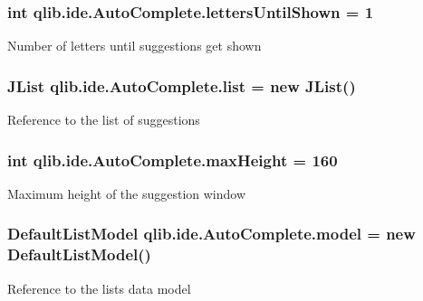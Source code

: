 \subsubsection[{\texorpdfstring{letters\+Until\+Shown}{lettersUntilShown}}]{\setlength{\rightskip}{0pt plus 5cm}int qlib.\+ide.\+Auto\+Complete.\+letters\+Until\+Shown = 1\hspace{0.3cm}{\ttfamily [private]}}\hypertarget{classqlib_1_1ide_1_1AutoComplete_ab4de0d96f7b92c3768e1c08fbb47aed5}{}\label{classqlib_1_1ide_1_1AutoComplete_ab4de0d96f7b92c3768e1c08fbb47aed5}
Number of letters until suggestions get shown 
\subsubsection[{\texorpdfstring{list}{list}}]{\setlength{\rightskip}{0pt plus 5cm}J\+List qlib.\+ide.\+Auto\+Complete.\+list = new J\+List()\hspace{0.3cm}{\ttfamily [private]}}\hypertarget{classqlib_1_1ide_1_1AutoComplete_ab04a22ed940369f199952db2ce1c04f8}{}\label{classqlib_1_1ide_1_1AutoComplete_ab04a22ed940369f199952db2ce1c04f8}
Reference to the list of suggestions 
\subsubsection[{\texorpdfstring{max\+Height}{maxHeight}}]{\setlength{\rightskip}{0pt plus 5cm}int qlib.\+ide.\+Auto\+Complete.\+max\+Height = 160\hspace{0.3cm}{\ttfamily [private]}}\hypertarget{classqlib_1_1ide_1_1AutoComplete_a8ebc95801d3b19aff09123cf8729e2c9}{}\label{classqlib_1_1ide_1_1AutoComplete_a8ebc95801d3b19aff09123cf8729e2c9}
Maximum height of the suggestion window 
\subsubsection[{\texorpdfstring{model}{model}}]{\setlength{\rightskip}{0pt plus 5cm}Default\+List\+Model qlib.\+ide.\+Auto\+Complete.\+model = new Default\+List\+Model()\hspace{0.3cm}{\ttfamily [private]}}\hypertarget{classqlib_1_1ide_1_1AutoComplete_aaaa89916b82f63bd8d7079c84c251e27}{}\label{classqlib_1_1ide_1_1AutoComplete_aaaa89916b82f63bd8d7079c84c251e27}
Reference to the list\textquotesingle{}s data model 
